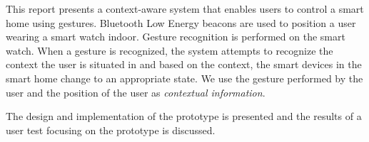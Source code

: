 This report presents a context-aware system that enables users to control a smart home using gestures. Bluetooth Low Energy beacons are used to position a user wearing a smart watch indoor. Gesture recognition is performed on the smart watch. When a gesture is recognized, the system attempts to recognize the context the user is situated in and based on the context, the smart devices in the smart home change to an appropriate state. We use the gesture performed by the user and the position of the user as \emph{contextual information}.

The design and implementation of the prototype is presented and the results of a user test focusing on the prototype is discussed.